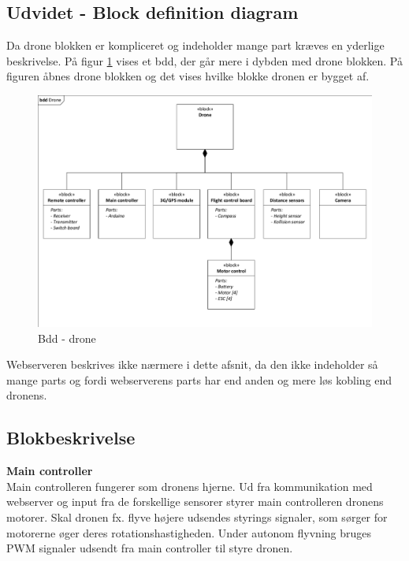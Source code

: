 \newpage
\subsection{Udvidet - Block definition diagram}
Da drone blokken er kompliceret og indeholder mange part kræves en yderlige beskrivelse. På figur \ref{fig:bdd_drone} vises et bdd, der går mere i dybden med drone blokken. På figuren åbnes drone blokken og det vises hvilke blokke dronen er bygget af. 

\begin{figure}[H]
\centering
\includegraphics[width=1.\textwidth]{Billeder/BDD/bdd_drone.pdf}
\vspace{-0.5cm}
\caption{Bdd - drone}
\label{fig:bdd_drone}
\end{figure}

\vspace{0.5cm}

Webserveren beskrives ikke nærmere i dette afsnit, da den ikke indeholder så mange parts og fordi webserverens parts har end anden og mere løs kobling end dronens.

\newpage

\subsection{Blokbeskrivelse}

\textbf{Main controller}\\
Main controlleren fungerer som dronens hjerne. Ud fra kommunikation med webserver og input fra de forskellige sensorer styrer main controlleren dronens motorer. Skal dronen fx. flyve højere udsendes styrings signaler, som sørger for motorerne øger deres rotationshastigheden. Under autonom flyvning bruges PWM signaler udsendt fra main controller til styre dronen. 

